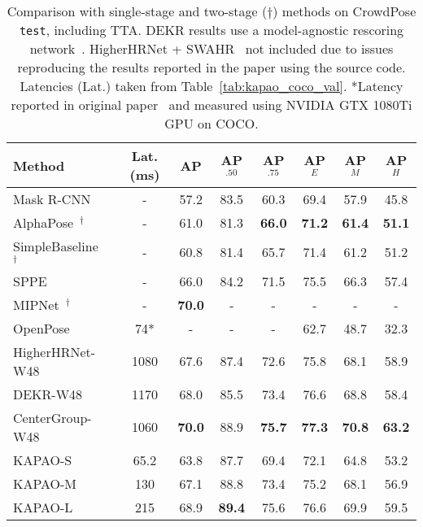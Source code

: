 \documentclass[runningheads]{llncs}
\newcommand\hll[1]{\bgroup
  \hskip0pt\color{black}#1\egroup
}
\begin{document}
\begin{table}[t!]
\footnotesize
\centering
\begin{tabular}{l|c|c|c|c|c|c|c}
	\hline
	Method & \hll{Lat. (ms)} & AP & AP$^{.50}$ & AP$^{.75}$ & AP$^E$ & AP$^M$ & AP$^H$\\
	\hline
	Mask R-CNN~\cite{he2017mask} & - & 57.2 & 83.5 & 60.3 & 69.4 & 57.9 & 45.8 \\
	AlphaPose~\cite{fang2017rmpe}$^\dagger$ & - & 61.0 & 81.3 & \textbf{66.0} & \textbf{71.2} & \textbf{61.4} & \textbf{51.1} \\
	\hll{SimpleBaseline~\cite{xiao2018simple}}$^\dagger$ & - & 60.8 & 81.4 & 65.7 & 71.4 & 61.2 & 51.2 \\
	SPPE~\cite{li2019crowdpose} & - & 66.0 & 84.2 & 71.5 & 75.5 & 66.3 & 57.4 \\
	MIPNet~\cite{khirodkar2021multi}$^\dagger$ & - & \textbf{70.0} & - & - & - & - & - \\
	\hline
	OpenPose~\cite{cao2017realtime} & 74* & - & - & - & 62.7 & 48.7 & 32.3 \\
	HigherHRNet-W48~\cite{cheng2020higherhrnet} & 1080 & 67.6 & 87.4 & 72.6 & 75.8 & 68.1 & 58.9\\
DEKR-W48~\cite{geng2021bottom} & 1170 & 68.0 & 85.5 & 73.4 & 76.6 & 68.8 & 58.4\\
	\hll{CenterGroup-W48~\cite{braso2021center}} & 1060 & \textbf{70.0} & 88.9 & \textbf{75.7} & \textbf{77.3} & \textbf{70.8} & \textbf{63.2} \\
	KAPAO-S & 65.2 & 63.8 & 87.7 & 69.4 & 72.1 & 64.8 & 53.2 \\
	KAPAO-M & 130 & 67.1 & 88.8 & 73.4 & 75.2 & 68.1 & 56.9 \\
	KAPAO-L & 215 & 68.9 & \textbf{89.4} & 75.6 & 76.6 & 69.9 & 59.5 \\
	\hline
\end{tabular}
\smallskip
\caption[KAPAO compared to state-of-the-art two-stage and single-stage methods on CrowdPose.]{Comparison with single-stage and two-stage ($\dagger$) methods on CrowdPose \texttt{test}, including TTA. DEKR results use a model-agnostic rescoring network~\cite{geng2021bottom}. \hll{HigherHRNet + SWAHR~\cite{luo2021rethinking} not included due to issues reproducing the results reported in the paper using the source code. Latencies (Lat.) taken from Table~\ref{tab:kapao_coco_val}. *Latency reported in original paper~\cite{cao2018openpose} and measured using NVIDIA GTX 1080Ti GPU on COCO.}}
\label{tab:kapao_crowdpose_test}
\end{table}
\end{document}

